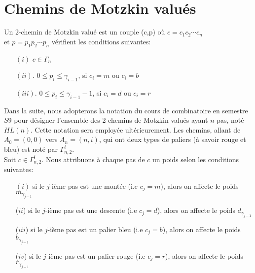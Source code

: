 \section{Chemins de Motzkin valués}
\begin{definition}
	\begin{rm}
		Un 2-chemin de Motzkin valué est un couple (c,p) où $c = c_{1}c_{2}\cdots c_{n}$\\ et $p = p_{1}p_{2}\cdots p_{n}$
		vérifient les conditions suivantes:
		\begin{itemize}
			\item[$(i)$] $c \in \Gamma_{n}$
			\item[$(ii)$.] $0\leq p_{i}\leq \gamma_{i-1}$, si $c_{i}=m\text{ ou }c_{i}=b$
			\item[$(iii)$.]  $0\leq p_{i}\leq \gamma_{i-1} - 1$, si  $c_{i}=d\text{ ou }c_{i}=r$
		\end{itemize}
	\end{rm}
\end{definition}
Dans la suite, nous adopterons la notation du cours de combinatoire en semestre $S9$ pour désigner l'ensemble des 2-chemins de Motzkin valués ayant $n$ pas, noté $HL(n)$. Cette notation sera employée ultérieurement. Les chemins, allant de $A_{0}=(0, 0)$ vers $A_{n}=(n, i)$, qui ont deux types de paliers (à savoir rouge et bleu) est noté par $\Gamma_{n, 2}^{i}$. \\
Soit $c \in \Gamma_{n, 2}^{i}$. Nous attribuons à chaque pas de $c$ un poids selon les conditions suivantes:
\begin{itemize}
	\item [$(i)$] si le $j$-ième pas est une montée (i.e $c_{j}=m$), alors on affecte le poids $m_{\gamma_{j-1}}$
	\item [($ii$)] si le $j$-ième pas est une descente (i.e $c_{j}=d$), alors on affecte le poids $d_{\gamma_{j-1}}$
	\item [($iii$)]  si le $j$-ième pas est un palier bleu (i.e $c_{j}=b$), alors on affecte le poids $b_{\gamma_{j-1}}$
	\item [($iv$)]  si le $j$-ième pas est un palier rouge (i.e $c_{j}=r$), alors on affecte le poids $r_{\gamma_{j-1}}$
\end{itemize}
